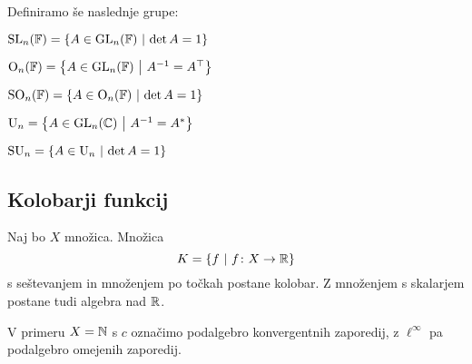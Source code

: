 \begin{definicija}
Definiramo še naslednje grupe:

\begin{description}[labelwidth=\widthof{\bfseries Posebna ortogonalna:}]
\item[Posebna linearna:]
$\operatorname{SL}_n(\mathbb{F}) = \left\{A \in \operatorname{GL}_n(\mathbb{F})~\middle\vert~\det A = 1\right\}$
\item[Ortogonalna:]
$\operatorname{O}_n(\mathbb{F}) = \left\{A \in \operatorname{GL}_n(\mathbb{F})~\middle\vert~A^{-1} = A^\top\right\}$
\item[Posebna ortogonalna:]
$\operatorname{SO}_n(\mathbb{F}) =
\left\{A \in \operatorname{O}_n(\mathbb{F})~\middle\vert~\det A = 1\right\}$
\item[Unitarna:]
$\operatorname{U}_n = \left\{A \in \operatorname{GL}_n(\mathbb{C})~\middle\vert~A^{-1} = A^*\right\}$
\item[Posebna unitarna:]
$\operatorname{SU}_n =
\left\{A \in \operatorname{U}_n~\middle\vert~\det A = 1\right\}$
\end{description}
\end{definicija}

\newpage

\subsection{Kolobarji funkcij}

\begin{definicija}
Naj bo $X$ množica. Množica
\[
K = \left\{f~\middle\vert~f \colon X \to \mathbb{R}\right\}
\]
s seštevanjem in množenjem po točkah postane kolobar. Z množenjem
s skalarjem postane tudi algebra nad $\mathbb{R}$.
\end{definicija}

\begin{definicija}
V primeru $X = \mathbb{N}$ s $c$ označimo podalgebro konvergentnih
zaporedij, z $\ell^\infty$ pa podalgebro omejenih zaporedij.
\end{definicija}
